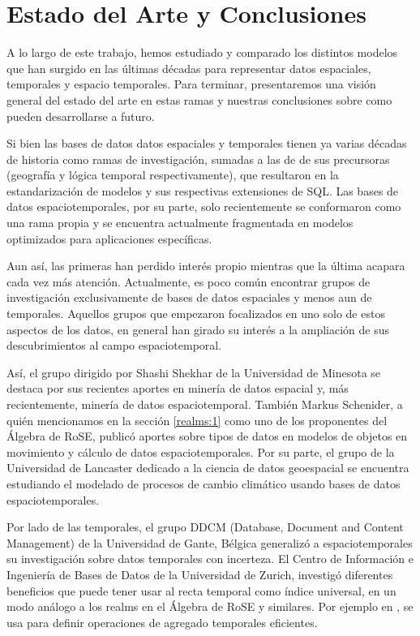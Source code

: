 \chapter{Estado del Arte y Conclusiones}  \label{cap:conc}

A lo largo de este trabajo, hemos estudiado y comparado los distintos modelos que han surgido en las últimas décadas para representar datos espaciales, temporales y espacio temporales. Para terminar, presentaremos una visión general del estado del arte en estas ramas y nuestras conclusiones sobre como pueden desarrollarse a futuro.

Si bien las bases de datos datos espaciales y temporales tienen ya varias décadas de historia como ramas de investigación, sumadas a las de de sus precursoras (geografía y lógica temporal respectivamente), que resultaron en la estandarización de modelos y sus respectivas extensiones de SQL. Las bases de datos espaciotemporales, por su parte, solo recientemente se conformaron como una rama propia y se encuentra actualmente fragmentada en modelos optimizados para aplicaciones específicas.

Aun así, las primeras han perdido interés propio mientras que la última acapara cada vez más atención. Actualmente, es poco común encontrar grupos de investigación exclusivamente de bases de datos espaciales y menos aun de temporales. Aquellos grupos que empezaron focalizados en uno solo de estos aspectos de los datos, en general han girado su interés a la ampliación de sus descubrimientos al campo espaciotemporal.

Así, el grupo dirigido por Shashi Shekhar de la Universidad de Minesota se destaca por sus recientes aportes en minería de datos espacial\textsuperscript{\cite{spatial:datamining}} y, más recientemente, minería de datos espaciotemporal\textsuperscript{\cite{spatiotemporal:datamining}}. También Markus Schenider, a quién mencionamos en la sección \ref{realms:1} como uno de los proponentes del Álgebra de RoSE, publicó aportes sobre tipos de datos en modelos de objetos en movimiento\textsuperscript{\cite{schenider:moving}} y cálculo de datos espaciotemporales\textsuperscript{\cite{schenider:calculo}}. Por su parte, el grupo de la Universidad de Lancaster dedicado a la ciencia de datos geoespacial se encuentra estudiando el modelado de procesos de cambio climático usando bases de datos espaciotemporales\textsuperscript{\cite{climate}}.

Por lado de las temporales, el grupo DDCM (Database, Document and Content Management) de la Universidad
de Gante, Bélgica generalizó a espaciotemporales\textsuperscript{\cite{gant:st}} su investigación sobre datos
temporales con incerteza\textsuperscript{\cite{gant:t}}. El Centro de Información e Ingeniería de Bases de Datos de la Universidad de Zurich, investigó diferentes beneficios que puede tener usar al recta temporal como
índice universal, en un modo análogo a los realms en el Álgebra de RoSE y similares. Por ejemplo en \cite{sweeping}, se usa para definir operaciones de agregado temporales eficientes.

